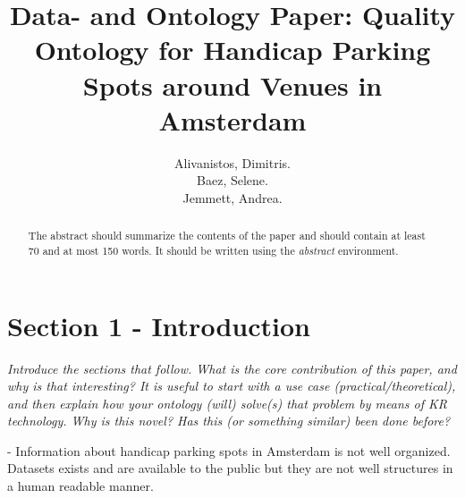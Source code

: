 \documentclass[runningheads,a4paper]{../../StyleFiles/llncs}
\begin{document}
\mainmatter  %

\title{Data- and Ontology Paper: Quality Ontology for Handicap Parking Spots around Venues in Amsterdam}


%
%
\author{Alivanistos, Dimitris. \\ Baez, Selene. \\ Jemmett, Andrea. }
%


\maketitle


\begin{abstract}
The abstract should summarize the contents of the paper and should
contain at least 70 and at most 150 words. It should be written using the
\emph{abstract} environment.
\end{abstract}


\section{Section 1 - Introduction}
\textit{Introduce the sections that follow. What is the core contribution of this paper, and why is that interesting? It is useful to start with a use case (practical/theoretical), and then explain how your ontology (will) solve(s) that problem by means of KR technology. Why is this novel? Has this (or something similar) been done before?}

- Information about handicap parking spots in Amsterdam is not well organized. Datasets exists and are available to the public but they are not well structures in a human readable manner. 
\end{document}
